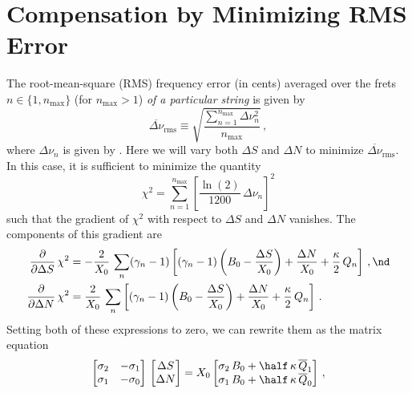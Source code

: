 %
%
%

 \section{Compensation by Minimizing RMS Error\label{app:rms}}

The root-mean-square (RMS) frequency error (in cents) averaged over the frets $n \in \{1, n_\text{max}\}$ (for $n_\text{max} > 1$) \emph{of a particular string} is given by
 \begin{equation}\label{eqn:rms_def}
\overline{\Delta \nu}_\text{rms} \equiv \sqrt{\frac{\sum_{n = 1}^{n_\text{max}} \Delta \nu_n^2}{n_\text{max}}}\, ,
 \end{equation}
where $\Delta \nu_n$ is given by . Here we will vary both $\Delta S$ and $\Delta N$ to minimize $\overline{\Delta \nu}_\text{rms}$. In this case, it is sufficient to minimize the quantity
 \begin{equation}\label{eqn:chi2_def}
\chi^2 = \sum_{n = 1}^{n_\text{max}} \left[\frac{\ln(2)}{1200}\, \Delta \nu_n\right]^2
 \end{equation}
such that the gradient of $\chi^2$ with respect to $\Delta S$ and $\Delta N$ vanishes. The components of this gradient are
 \begin{subequations}\label{chi2_grad}
 \begin{align}
\frac{\partial}{\partial \Delta S}\, \chi^2 &= -\frac{2}{X_0}\, \sum_n (\gamma_n - 1)\left[ (\gamma_n - 1) \left(B_0 - \frac{\Delta S}{X_0}\right) + \frac{\Delta N}{X_0} + \frac{\kappa}{2}\, Q_n \right]\, , \nd \\
\frac{\partial}{\partial \Delta N}\, \chi^2 &= \frac{2}{X_0}\, \sum_n \left[ (\gamma_n - 1) \left(B_0 - \frac{\Delta S}{X_0}\right) + \frac{\Delta N}{X_0} + \frac{\kappa}{2}\, Q_n \right]\, .
 \end{align}
 \end{subequations}
Setting both of these expressions to zero, we can rewrite them as the matrix equation
 \begin{equation} \label{eqn:rms_mat}
\begin{bmatrix}
  \sigma_2 & -\sigma_1 \\
  \sigma_1 & -\sigma_0
\end{bmatrix}\,
\begin{bmatrix}
  \Delta S \\
  \Delta N
\end{bmatrix} = X_0
\begin{bmatrix}
  \sigma_2\, B_0 +  \half\, \kappa\, \overline{Q}_1 \\
  \sigma_1\, B_0 +  \half\, \kappa\, \overline{Q}_0
\end{bmatrix}\, ,
 \end{equation}
